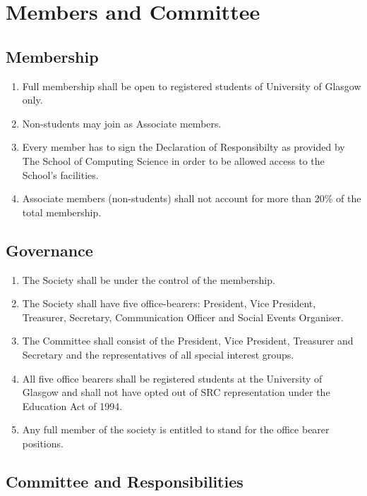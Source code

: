 \documentclass{report}
\newcommand{\bearersNo}{five}
\begin{document}
\chapter{Members and Committee}

\section{Membership}

	\begin{enumerate}
		\item{Full membership shall be open to registered students of University of Glasgow only.}
		\item{Non-students may join as Associate members.}
		\item{Every member has to sign the Declaration of Responsibilty as provided by The School of Computing Science in order to be allowed access to the School's facilities.}
		\item{Associate members (non-students) shall not account for more than 20\% of the total membership.}
	\end{enumerate}

\section{Governance}

	\begin{enumerate}
		\item{The Society shall be under the control of the membership.}
		\item{The Society shall have \bearersNo{} office-bearers: President, Vice President, Treasurer, Secretary, Communication Officer and Social Events Organiser.}
		\item{The Committee shall consist of the President, Vice President, Treasurer and Secretary and the representatives of all special interest groups.}
		\item{All \bearersNo{} office bearers shall be registered students at the University of Glasgow and shall not have opted out of SRC representation under the Education Act of 1994.}
		\item{Any full member of the society is entitled to stand for the office bearer positions.}
	\end{enumerate}
	
\section{Committee and Responsibilities}
\end{document}
